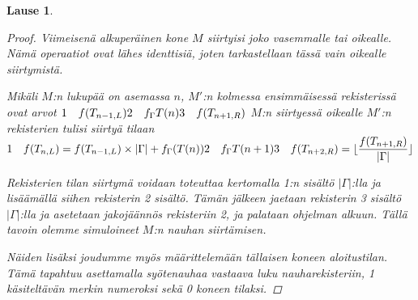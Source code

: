 \documentclass[a4paper, 12pt]{article}
\theoremstyle{definition}
\theoremstyle{plain}
\newtheorem{teor}[mydef]{Lause}
\begin{document}
\begin{teor}
\begin{proof}
Viimeisenä alkuperäinen kone $M$ siirtyisi joko vasemmalle tai oikealle. Nämä operaatiot ovat lähes identtisiä, joten tarkastellaan tässä vain oikealle siirtymistä.

Mikäli $M$:n lukupää on asemassa $n$, $M'$:n kolmessa ensimmäisessä rekisterissä ovat arvot 
\begin{math} \\
1\quad f(T_{n-1, L}) \\
2\quad f_{\Gamma}T(n) \\
3\quad f(T_{n+1, R})\\
\end{math}
$M$:n siirtyessä oikealle $M'$:n rekisterien tulisi siirtyä tilaan
\begin{math} \\
1\quad f(T_{n, L}) = f(T_{n-1, L}) \times |\Gamma| + f_{\Gamma}(T(n)) \\
2\quad f_{\Gamma}T(n+1) \\
3\quad f(T_{n+2, R}) = \lfloor\dfrac{f(T_{n+1, R})}{|\Gamma|}\rfloor
\end{math}

Rekisterien tilan siirtymä voidaan toteuttaa kertomalla 1:n sisältö $|\Gamma|$:lla ja lisäämällä siihen rekisterin 2 sisältö. Tämän jälkeen jaetaan rekisterin 3 sisältö $|\Gamma|$:lla ja asetetaan jakojäännös rekisteriin 2, ja palataan ohjelman alkuun. Tällä tavoin olemme simuloineet $M$:n nauhan siirtämisen.
\qedhere


Näiden lisäksi joudumme myös määrittelemään tällaisen koneen aloitustilan. Tämä tapahtuu asettamalla syötenauhaa vastaava luku nauharekisteriin, 1 käsiteltävän merkin numeroksi sekä 0 koneen tilaksi.

\qedhere
\end{proof}
\end{teor}
\end{document}
